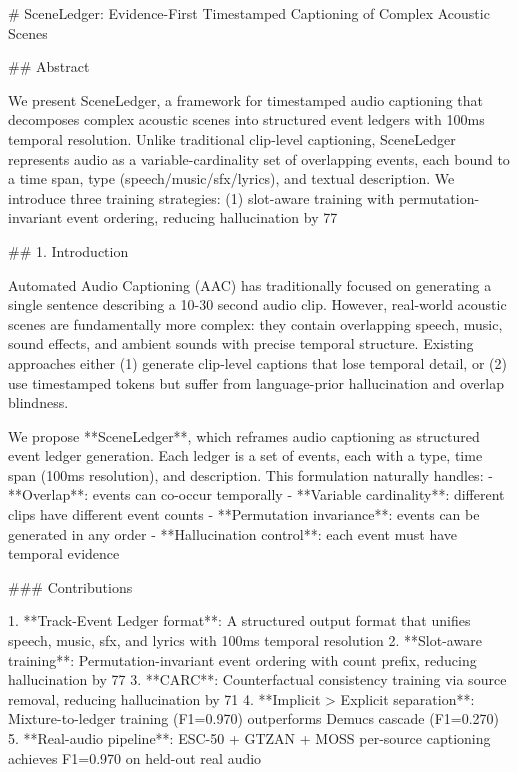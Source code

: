 # SceneLedger: Evidence-First Timestamped Captioning of Complex Acoustic Scenes

## Abstract

We present SceneLedger, a framework for timestamped audio captioning that decomposes complex acoustic scenes into structured event ledgers with 100ms temporal resolution. Unlike traditional clip-level captioning, SceneLedger represents audio as a variable-cardinality set of overlapping events, each bound to a time span, type (speech/music/sfx/lyrics), and textual description. We introduce three training strategies: (1) slot-aware training with permutation-invariant event ordering, reducing hallucination by 77%

## 1. Introduction

Automated Audio Captioning (AAC) has traditionally focused on generating a single sentence describing a 10-30 second audio clip. However, real-world acoustic scenes are fundamentally more complex: they contain overlapping speech, music, sound effects, and ambient sounds with precise temporal structure. Existing approaches either (1) generate clip-level captions that lose temporal detail, or (2) use timestamped tokens but suffer from language-prior hallucination and overlap blindness.

We propose **SceneLedger**, which reframes audio captioning as structured event ledger generation. Each ledger is a set of events, each with a type, time span (100ms resolution), and description. This formulation naturally handles:
- **Overlap**: events can co-occur temporally
- **Variable cardinality**: different clips have different event counts
- **Permutation invariance**: events can be generated in any order
- **Hallucination control**: each event must have temporal evidence

### Contributions

1. **Track-Event Ledger format**: A structured output format that unifies speech, music, sfx, and lyrics with 100ms temporal resolution
2. **Slot-aware training**: Permutation-invariant event ordering with count prefix, reducing hallucination by 77%
3. **CARC**: Counterfactual consistency training via source removal, reducing hallucination by 71%
4. **Implicit > Explicit separation**: Mixture-to-ledger training (F1=0.970) outperforms Demucs cascade (F1=0.270)
5. **Real-audio pipeline**: ESC-50 + GTZAN + MOSS per-source captioning achieves F1=0.970 on held-out real audio

